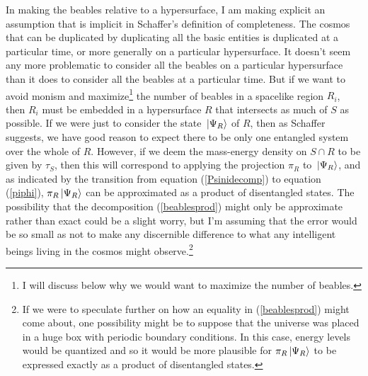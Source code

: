 In making the beables relative to a hypersurface, I am making explicit an assumption that is implicit in Schaffer's definition of completeness. The cosmos that can be duplicated by duplicating all the basic entities is duplicated at a particular time, or more generally on a particular hypersurface. It doesn't seem any more problematic to consider all the beables on a particular hypersurface than it does to consider all the beables at a particular time. But if we want to avoid monism and maximize\footnote{I will discuss below why we would want to maximize the number of beables.} the number of beables in a spacelike region  $R_i$, then $R_i$ must be embedded in a hypersurface $R$ that intersects as much of $S$ as possible. If we were just to consider the state $\ket*{\Psi_R}$ of $R$, then as Schaffer suggests, we have good reason to expect there to be only one entangled system over the whole of $R$. However, if we deem the mass-energy density on $S\cap R$ to be given by $\tau_S$, then this will correspond to applying the projection $\pi_R$ to $\ket*{\Psi_R}$, and as indicated by  the transition from equation (\ref{Psinidecomp}) to equation (\ref{piphi}), $\pi_R\ket*{\Psi_R}$ can be approximated as a product of disentangled states. The possibility that the decomposition (\ref{beablesprod}) might only be approximate rather than exact could be a slight worry, but I'm assuming that the error would be so small as not to make any discernible difference to what any intelligent beings living in the cosmos might observe.\footnote{If we were to speculate further on how an equality in (\ref{beablesprod}) might come about, one possibility might be to suppose that the universe was placed in a huge box with periodic boundary conditions. In this case, energy levels would be quantized and so it would be more plausible for  $\pi_R\ket*{\Psi_R}$ to be expressed exactly as a product of disentangled states.} 

